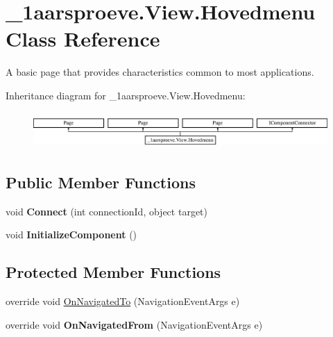 \hypertarget{class__1aarsproeve_1_1_view_1_1_hovedmenu}{}\section{\+\_\+1aarsproeve.\+View.\+Hovedmenu Class Reference}
\label{class__1aarsproeve_1_1_view_1_1_hovedmenu}


A basic page that provides characteristics common to most applications.  


Inheritance diagram for \+\_\+1aarsproeve.\+View.\+Hovedmenu\+:\begin{figure}[H]
\begin{center}
\leavevmode
\includegraphics[height=1.386139cm]{class__1aarsproeve_1_1_view_1_1_hovedmenu}
\end{center}
\end{figure}
\subsection*{Public Member Functions}
\begin{DoxyCompactItemize}
\item 
\hypertarget{class__1aarsproeve_1_1_view_1_1_hovedmenu_aeed9485754ac62ab25597d6404e433bc}{}void {\bfseries Connect} (int connection\+Id, object target)\label{class__1aarsproeve_1_1_view_1_1_hovedmenu_aeed9485754ac62ab25597d6404e433bc}

\item 
\hypertarget{class__1aarsproeve_1_1_view_1_1_hovedmenu_add366b00659bb8e885d9d771115edd45}{}void {\bfseries Initialize\+Component} ()\label{class__1aarsproeve_1_1_view_1_1_hovedmenu_add366b00659bb8e885d9d771115edd45}

\end{DoxyCompactItemize}
\subsection*{Protected Member Functions}
\begin{DoxyCompactItemize}
\item 
override void \hyperlink{class__1aarsproeve_1_1_view_1_1_hovedmenu_a4dcfaf095ce527ff701f5422c81e96a8}{On\+Navigated\+To} (Navigation\+Event\+Args e)
\item 
\hypertarget{class__1aarsproeve_1_1_view_1_1_hovedmenu_a74e7e27fd04a768bf9314dc870cb1ef6}{}override void {\bfseries On\+Navigated\+From} (Navigation\+Event\+Args e)\label{class__1aarsproeve_1_1_view_1_1_hovedmenu_a74e7e27fd04a768bf9314dc870cb1ef6}

\end{DoxyCompactItemize}
